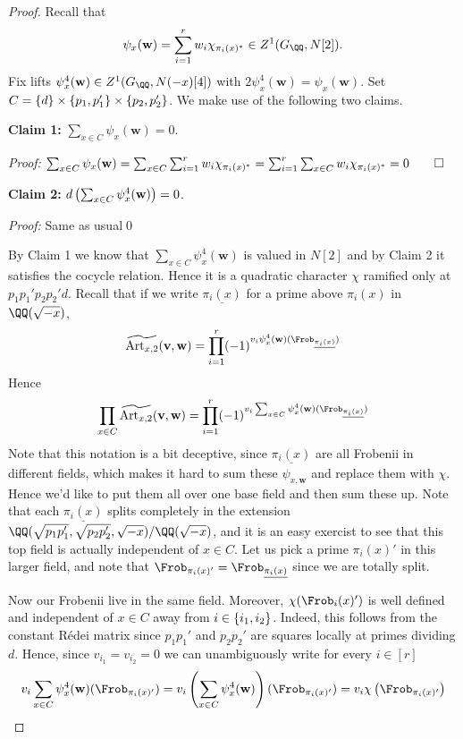 \documentclass{lecturenotes}
\newcommand{\Art}{\operatorname{Art}}
\newcommand{\bv}{\mathbf{v}}
\newcommand{\bw}{\mathbf{w}}
\numberwithin{equation}{section}
\begin{document}
\begin{proof}
    Recall that 
    \[\psi_x(\bw)=\sum_{i=1}^rw_i\chi_{\pi_i(x)^*}\in Z^1(G_\QQ,N[2]).\]
    Fix lifts $\psi_{x}^4(\bw)\in Z^1(G_\QQ,N(-x)[4])$ with $2\psi_x^4(\bw)=\psi_x(\bw)$.  Set $C=\left\{{d}\right\}\times \left\{{p_1,p_1'}\right\}\times \left\{{p_2,p_2'}\right\}$. We make use of the following two claims.

    \vspace{10pt}
    \textbf{Claim 1:} $\sum_{x\in C}\psi_x(\bw)=0$.

    \textit{Proof:}
    $\sum_{x\in C}\psi_x(\bw)=\sum_{x\in C}\sum_{i=1}^rw_i\chi_{\pi_i(x)^*}=\sum_{i=1}^r\sum_{x\in C}w_i\chi_{\pi_i(x)^*}=0\qed$

    \vspace{10pt}
    \textbf{Claim 2:} $d\braces{\sum_{x\in C}\psi_x^4(\bw)}=0$.

    \textit{Proof:} Same as usual\qed

    \vspace{10pt}

    By Claim 1 we know that $\sum_{x\in C}\psi_x^4(\bw)$ is valued in $N[2]$ and by Claim 2 it satisfies the cocycle relation.  Hence it is a quadratic character $\chi$ ramified only at $p_1p_1'p_2p_2'd$.  Recall that if we write $\underline{\pi_i(x)}$ for a prime above $\pi_i(x)$ in $\QQ(\sqrt{-x})$,
    \[\widetilde{\Art_{x,2}}(\bv,\bw)=\prod_{i=1}^r(-1)^{v_i\psi_x^4(\bw)(\Frob_{\underline{\pi_i(x)}})}\]
    Hence
    \begin{align*}
        \prod_{x\in C}\widetilde{\Art_{x,2}}(\bv,\bw)=\prod_{i=1}^r(-1)^{v_i\sum_{x\in C}\psi_x^4(\bw)(\Frob_{\underline{\pi_i(x)}})}
    \end{align*}
    Note that this notation is a bit deceptive, since $\underline{\pi_i(x)}$ are all Frobenii in different fields, which makes it hard to sum these $\psi_{x,\bw}$ and replace them with $\chi$.  Hence we'd like to put them all over one base field and then sum these up.  Note that each $\underline{\pi_i(x)}$ splits completely in the extension $\QQ(\sqrt{p_1p_1'},\sqrt{p_2p_2'},\sqrt{-x})/\QQ(\sqrt{-x})$, and it is an easy exercist to see that this top field is actually independent of $x\in C$.  Let us pick a prime $\pi_i(x)'$ in this larger field, and note that $\Frob_{\pi_i(x)'}=\Frob_{\underline{\pi_i(x)}}$ since we are totally split.

    Now our Frobenii live in the same field.  Moreover, $\chi(\Frob_{i}(x)')$ is well defined and independent of $x\in C$ away from $i\in\left\{{i_1,i_2}\right\}$.  Indeed, this follows from the constant R\'edei matrix since $p_1p_1'$ and $p_2p_2'$ are squares locally at primes dividing $d$. Hence, since $v_{i_1}=v_{i_2}=0$ we can unambiguously write for every $i\in[r]$
    \[v_i\sum_{x\in C}\psi_x^4(\bw)(\Frob_{\pi_i(x)'})=v_i\braces{\sum_{x\in C}\psi_x^4(\bw)}(\Frob_{\pi_i(x)'})=v_i\chi\braces{\Frob_{\pi_i(x)'}}\]


\end{proof}
\end{document}
